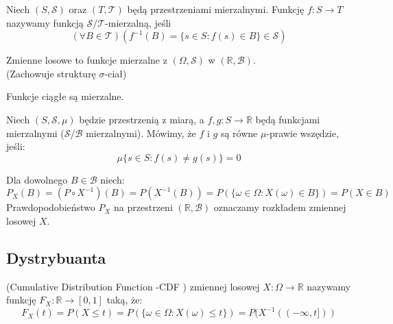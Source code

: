 \documentclass{article}
\newenvironment{definition}[1]{%
    \trivlist
    \item[\hskip\labelsep\textbf{Definition. #1.}]
    \ignorespaces
}{%
    \endtrivlist
}
\newenvironment{fact}[1]{%
    \trivlist
    \item[\hskip\labelsep\textbf{Fact. #1.}]
    \ignorespaces
}{%
    \endtrivlist
}
\newenvironment{information}[1]{%
    \trivlist
    \item[\hskip\labelsep\textbf{Information. #1.}]
    \ignorespaces
}{%
    \endtrivlist
}
\begin{document}
\begin{definition}{Funkcje mierzalne}
    Niech $(S, \mathcal{S})$ oraz $(T,\mathcal{T})$ będą przestrzeniami mierzalnymi. Funkcję $f: S \rightarrow T$ nazywamy funkcją $\mathcal{S}/\mathcal{T}$-mierzalną, jeśli
    \[
    (\forall B\in \mathcal{T})(f^{-1}(B) = \{ s\in S: f(s) \in B\} \in \mathcal{S})
    \]

    Zmienne losowe to funkcje mierzalne z $(\Omega, \mathcal{S})$ w $(\mathbb{R}, \mathcal{B})$.\\
    (Zachowuje strukturę $\sigma$-ciał)
\end{definition}

\begin{fact}{Funkcje ciągłe}
    Funkcje ciągłe są mierzalne.
\end{fact}

\begin{definition}{Równość prawie wszędzie}
    Niech $(S,\mathcal{S},\mu)$ będzie przestrzenią z miarą, a $f, g: S\rightarrow \mathbb{R}$ będą
    funkcjami mierzalnymi ($\mathcal{S}$/$\mathcal{B}$ mierzalnymi). Mówimy, że $f$ i $g$ są równe $\mu$-prawie wszędzie, jeśli:
    \[
        \mu\{ s\in S: f(s) \neq g(s)\} = 0
    \]
\end{definition}

\begin{information}{Oznaczenie}
    Dla dowolnego $B\in\mathcal{B}$ niech:
    \[
    P_X(B)=(P \circ X^{-1})(B) = P(X^{-1}(B)) = P(\{\omega \in \Omega: X(\omega) \in B\}) = P(X\in B)
    \]
    Prawdopodobieństwo $P_X$ na przestrzeni $(\mathbb{R},\mathcal{B})$ oznaczamy rozkładem zmiennej losowej $X$.
\end{information}

\subsection{Dystrybuanta}

\begin{definition}{Dystrybuanta}
    (Cumulative Distribution Function -CDF ) zmiennej losowej $X: \Omega \rightarrow \mathbb{R}$ nazywamy funkcję $F_X : \mathbb{R} \rightarrow [0,1]$ taką, że:
    \[
    F_X(t) = P(X\leq t) = P(\{ \omega\in\Omega: X(\omega)\leq t\}) = P(X^{-1}((-\infty,t]))
    \]
\end{definition}
\end{document}
